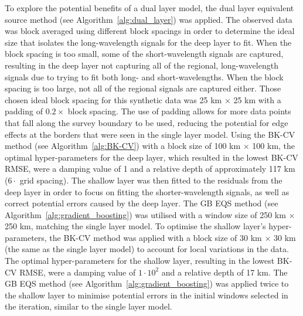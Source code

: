 To explore the potential benefits of a dual layer model, the dual layer equivalent source method (see Algorithm~\ref{alg:dual_layer}) was applied. The observed data was block averaged using different block spacings in order to determine the ideal size that isolates the long-wavelength signals for the deep layer to fit. When the block spacing is too small, some of the short-wavelength signals are captured, resulting in the deep layer not capturing all of the regional, long-wavelength signals due to trying to fit both long- and short-wavelengths. When the block spacing is too large, not all of the regional signals are captured either. Those chosen ideal block spacing for this synthetic data was 25 km $\times$ 25 km with a padding of $0.2 \times $ block spacing. The use of padding allows for more data points that fall along the survey boundary to be used, reducing the potential for edge effects at the borders that were seen in the single layer model. Using the BK-CV method (see Algorithm~\ref{alg:BK-CV}) with a block size of 100 km $\times$ 100 km, the optimal hyper-parameters for the deep layer, which resulted in the lowest BK-CV RMSE, were a damping value of 1 and a relative depth of approximately 117 km ($6 \cdot $ grid spacing). The shallow layer was then fitted to the residuals from the deep layer in order to focus on fitting the shorter-wavelength signals, as well as correct potential errors caused by the deep layer. The GB EQS method (see Algorithm~\ref{alg:gradient_boosting}) was utilised with a window size of 250 km $\times$ 250 km, matching the single layer model. To optimise the shallow layer’s hyper-parameters, the BK-CV method was applied with a block size of 30 km $\times$ 30 km (the same as the single layer model) to account for local variations in the data. The optimal hyper-parameters for the shallow layer, resulting in the lowest BK-CV RMSE, were a damping value of $1 \cdot 10^{2}$ and a relative depth of 17 km. The GB EQS method (see Algorithm~\ref{alg:gradient_boosting}) was applied twice to the shallow layer to minimise potential errors in the initial windows selected in the iteration, similar to the single layer model. 

